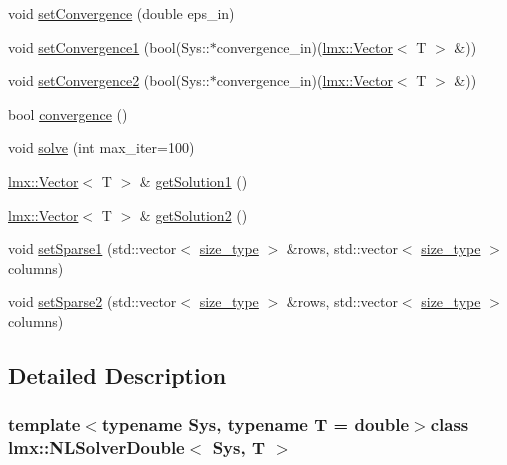 \begin{DoxyCompactItemize}
\item 
void \hyperlink{classlmx_1_1NLSolverDouble_aeeb801cf13dde53b07fef84a498988b2}{set\-Convergence} (double eps\-\_\-in)
\item 
void \hyperlink{classlmx_1_1NLSolverDouble_aea72f9633aa043058d551f760e03aa68}{set\-Convergence1} (bool(Sys\-::$\ast$convergence\-\_\-in)(\hyperlink{classlmx_1_1Vector}{lmx\-::\-Vector}$<$ T $>$ \&))
\item 
void \hyperlink{classlmx_1_1NLSolverDouble_a50c13cc6c73a01a100ec0d951dbea10e}{set\-Convergence2} (bool(Sys\-::$\ast$convergence\-\_\-in)(\hyperlink{classlmx_1_1Vector}{lmx\-::\-Vector}$<$ T $>$ \&))
\item 
bool \hyperlink{classlmx_1_1NLSolverDouble_a5deba839ef7040f727a89b56ba0b72e0}{convergence} ()
\item 
void \hyperlink{classlmx_1_1NLSolverDouble_af5b1577ca5bfba51cc2aacb7c5858ccc}{solve} (int max\-\_\-iter=100)
\item 
\hyperlink{classlmx_1_1Vector}{lmx\-::\-Vector}$<$ T $>$ \& \hyperlink{classlmx_1_1NLSolverDouble_a26dfb2cf77f737309c9a8e831809615d}{get\-Solution1} ()
\item 
\hyperlink{classlmx_1_1Vector}{lmx\-::\-Vector}$<$ T $>$ \& \hyperlink{classlmx_1_1NLSolverDouble_a185eb1820c0df4237a8eb6fbeaeec022}{get\-Solution2} ()
\item 
void \hyperlink{classlmx_1_1NLSolverDouble_a3bccf20d11411411a50aa70ab8623609}{set\-Sparse1} (std\-::vector$<$ \hyperlink{lmx__mat__data_8h_a49b489a408a211a90e766329c0732d7b}{size\-\_\-type} $>$ \&rows, std\-::vector$<$ \hyperlink{lmx__mat__data_8h_a49b489a408a211a90e766329c0732d7b}{size\-\_\-type} $>$ columns)
\item 
void \hyperlink{classlmx_1_1NLSolverDouble_ab2289098a67a2cab3694e378be8b7a59}{set\-Sparse2} (std\-::vector$<$ \hyperlink{lmx__mat__data_8h_a49b489a408a211a90e766329c0732d7b}{size\-\_\-type} $>$ \&rows, std\-::vector$<$ \hyperlink{lmx__mat__data_8h_a49b489a408a211a90e766329c0732d7b}{size\-\_\-type} $>$ columns)
\end{DoxyCompactItemize}


\subsection{Detailed Description}
\subsubsection*{template$<$typename Sys, typename T = double$>$class lmx\-::\-N\-L\-Solver\-Double$<$ Sys, T $>$}

